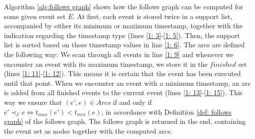 Algorithm \ref{alg:follows graph} shows how the follows graph can be computed for some given event set $E$.
At first, each event is stored twice in a support list, accompanied by either its minimum or maximum timestamp, together with the indication regarding the timestamp type (lines \ref{1: 3}-\ref{1: 5}).
Then, the support list is sorted based on these timestamp values in line \ref{1: 6}.
The arcs are defined the following way:
We scan through all events in line \ref{1: 9} and whenever we encounter an event with its maximum timestamp, we store it in the $finished$ set (lines \ref{1: 11}-\ref{1: 12}).
This means it is certain that the event has been executed until that point.
When we encounter an event with a minimum timestamp, an arc is added from all finished events to the current event (lines \ref{1: 13}-\ref{1: 15}).
This way we ensure that $(e',e) \in Arcs$ if and only if $e' \prec_{\mathcal{E}} e \Leftrightarrow t_{max}(e') < t_{min}(e)$, in accordance with Definition \ref{def: follows graph} of the follows graph.
The follows graph is returned in the end, containing the event set as nodes together with the computed arcs.

